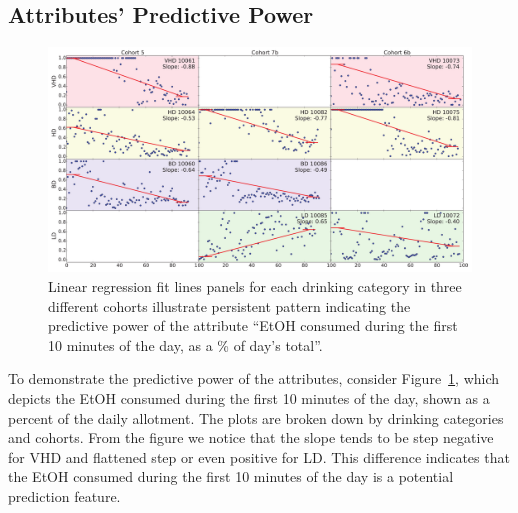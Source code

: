 	\subsection{Attributes' Predictive Power}
	\begin{figure}[ht]
		\centering
		\includegraphics[width=\linewidth]{figures/attributes-predictive-power.pdf}
		\caption{Linear regression fit lines panels for each drinking category in three different cohorts illustrate persistent pattern indicating the predictive power of the attribute ``EtOH consumed during the first 10 minutes of the day, as a \% of day's total''.}
		\label{fig:attributes}	
	\end{figure}
	To demonstrate the predictive power of the attributes, consider Figure~\ref{fig:attributes}, which depicts the EtOH consumed during the first 10 minutes of the day, shown as a percent of the daily allotment. The plots are broken down by drinking categories and cohorts. From the figure we notice that the slope tends to be step negative for VHD and flattened step or even positive for LD. This difference indicates that the EtOH consumed during the first 10 minutes of the day is a potential prediction feature. 


